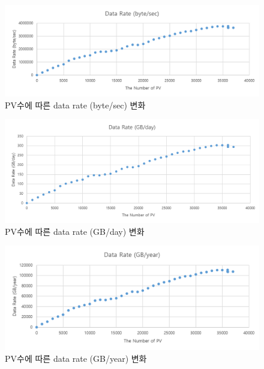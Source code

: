 \documentclass[11pt
  , a4paper
  , article
  , oneside
]{memoir}
\begin{document}
	\begin{figure}[h!]
		\centering
		\includegraphics[width=1\textwidth, height=0.3\textheight]{./images/sec.png}
		\caption{PV수에 따른 data rate (byte/sec) 변화}
	\end{figure}
	\clearpage
	\begin{figure}[h!]
		\centering
		\includegraphics[width=1\textwidth, height=0.25\textheight]{./images/day.png}
		\caption{PV수에 따른 data rate (GB/day) 변화}
	\end{figure}
	\begin{figure}[h!]
		\centering
		\includegraphics[width=1\textwidth, height=0.25\textheight]{./images/year.png}
		\caption{PV수에 따른 data rate (GB/year) 변화}
	\end{figure}
\end{document}
